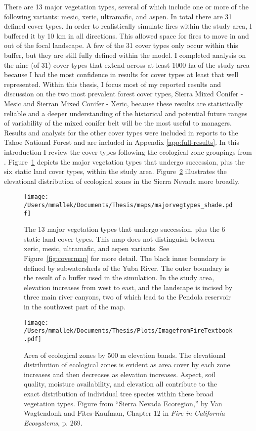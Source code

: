 There are 13 major vegetation types, several of which include one or more of the following variants: mesic, xeric, ultramafic, and aspen. In total there are 31 defined cover types. In order to realistically simulate fires within the study area, I buffered it by 10 km in all directions. This allowed space for fires to move in and out of the focal landscape. A few of the 31 cover types only occur within this buffer, but they are still fully defined within the model. I completed analysis on the nine (of 31) cover types that extend across at least 1000 ha of the study area because I had the most confidence in results for cover types at least that well represented. Within this thesis, I focus most of my reported results and discussion on the two most prevalent forest cover types, Sierra Mixed Conifer - Mesic and Sierran Mixed Conifer - Xeric, because these results are statistically reliable and a deeper understanding of the historical and potential future ranges of variability of the mixed conifer belt will be the most useful to managers. Results and analysis for the other cover types were included in reports to the Tahoe National Forest and are included in Appendix \ref{app:full-results}. In this introduction I review the cover types following the ecological zone groupings from \citet{VanWag2006}. Figure~\ref{fig:majorvegtypes} depicts the major vegetation types that undergo succession, plus the six static land cover types, within the study area. Figure~\ref{fig:ecologicalzonebands} illustrates the elevational distribution of ecological zones in the Sierra Nevada more broadly.


\begin{figure}[!htbp]
\centering
\texttt{[image: /Users/mmallek/Documents/Thesis/maps/majorvegtypes\_shade.pdf]}
\caption{The 13 major vegetation types that undergo succession, plus the 6 static land cover types. This map does not distinguish between xeric, mesic, ultramafic, and aspen variants. See Figure~\ref{fig:covermap} for more detail. The black inner boundary is defined by subwatersheds of the Yuba River. The outer boundary is the result of a buffer used in the simulation. In the study area, elevation increases from west to east, and the landscape is incised by three main river canyons, two of which lead to the Pendola reservoir in the southwest part of the map.
}
\label{fig:majorvegtypes}
\end{figure}

\begin{figure}[!htbp]
\centering
\texttt{[image: /Users/mmallek/Documents/Thesis/Plots/ImagefromFireTextbook.pdf]}
\caption{Area of ecological zones by 500 m elevation bands. The elevational distribution of ecological zones is evident as area cover by each zone increases and then decreases as elevation increases. Aspect, soil quality, moisture availability, and elevation all contribute to the exact distribution of individual tree species within these broad vegetation types. Figure from ``Sierra Nevada Ecoregion,'' by Van Wagtendonk and Fites-Kaufman, Chapter 12 in \emph{Fire in California Ecosystems}, p. 269.}
\label{fig:ecologicalzonebands}
\end{figure}

